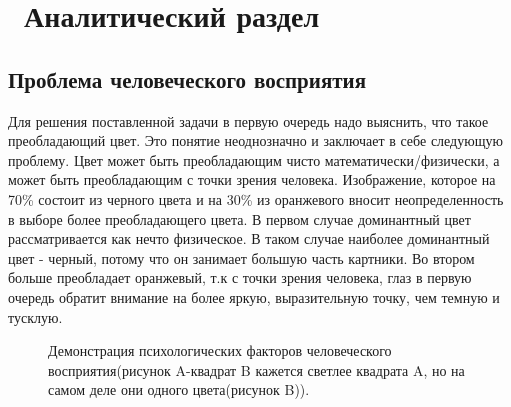 \chapter{ Аналитический раздел}
\label{cha:analysis}
\section{ Проблема человеческого восприятия}
Для решения поставленной задачи в первую очередь надо выяснить, что такое преобладающий цвет. Это понятие неоднозначно и заключает в себе следующую проблему. Цвет может быть преобладающим чисто математически/физически, а может быть преобладающим с точки зрения человека. Изображение, которое на 70\% состоит из черного цвета и на 30\% из оранжевого вносит неопределенность в выборе более преобладающего цвета. В первом случае доминантный цвет рассматривается как нечто физическое. В таком случае наиболее доминантный цвет - черный, потому что он занимает большую часть картники. Во втором больше преобладает оранжевый, т.к с точки зрения человека, глаз в первую очередь обратит внимание на более яркую, выразительную точку, чем темную и тусклую.

\begin{figure}[ht!]
\end{figure}

\begin{figure}[ht!]%
    \centering
    \qquad
	\caption{Демонстрация психологических факторов человеческого восприятия(рисунок A-квадрат B кажется светлее квадрата A, но на самом деле они одного цвета(рисунок B)).}%
    \label{fig:example}%
\end{figure}

